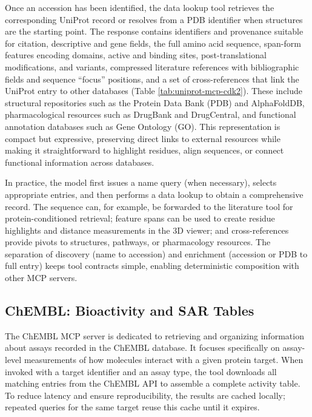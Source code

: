 \documentclass{article}
\begin{document}
Once an accession has been identified, the data lookup tool retrieves the corresponding UniProt record or resolves from a PDB identifier when structures are the starting point. The response contains identifiers and provenance suitable for citation, descriptive and gene fields, the full amino acid sequence, span-form features encoding domains, active and binding sites, post-translational modifications, and variants, compressed literature references with bibliographic fields and sequence “focus” positions, and a set of cross-references that link the UniProt entry to other databases (Table \ref{tab:uniprot-mcp-cdk2}). These include structural repositories such as the Protein Data Bank (PDB) and AlphaFoldDB, pharmacological resources such as DrugBank and DrugCentral, and functional annotation databases such as Gene Ontology (GO). This representation is compact but expressive, preserving direct links to external resources while making it straightforward to highlight residues, align sequences, or connect functional information across databases.

In practice, the model first issues a name query (when necessary), selects appropriate entries, and then performs a data lookup to obtain a comprehensive record. The sequence can, for example, be forwarded to the literature tool for protein-conditioned retrieval; feature spans can be used to create residue highlights and distance measurements in the 3D viewer; and cross-references provide pivots to structures, pathways, or pharmacology resources. The separation of discovery (name to accession) and enrichment (accession or PDB to full entry) keeps tool contracts simple, enabling deterministic composition with other MCP servers.




\subsection{ChEMBL: Bioactivity and SAR Tables}\label{sec:data:chembl}
The ChEMBL MCP server is dedicated to retrieving and organizing information about assays recorded in the ChEMBL database. It focuses specifically on assay-level measurements of how molecules interact with a given protein target. When invoked with a target identifier and an assay type, the tool downloads all matching entries from the ChEMBL API to assemble a complete activity table. To reduce latency and ensure reproducibility, the results are cached locally; repeated queries for the same target reuse this cache until it expires.
\end{document}
